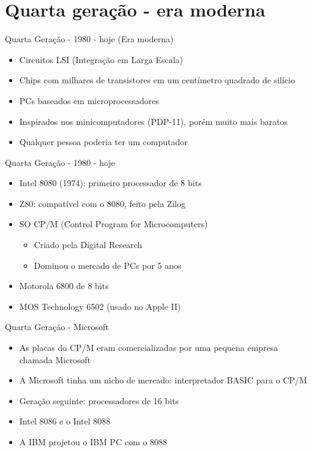 \documentclass{beamer}
\begin{document}
\section{Quarta geração - era moderna}
\begin{frame}{Quarta Geração - 1980 - hoje (Era moderna)}
      \begin{itemize}
          \item Circuitos LSI (Integração em Larga Escala)
          \item Chips com milhares de transistores em um centímetro quadrado de silício
          \item PCs baseados em microprocessadores
          \item Inspirados nos minicomputadores (PDP-11), porém muito mais baratos
          \item Qualquer pessoa poderia ter um computador
      \end{itemize}
  \end{frame}
  \begin{frame}{Quarta Geração - 1980 - hoje}
      \begin{itemize}
          \item Intel 8080 (1974): primeiro processador de 8 bits
          \item Z80: compatível com o 8080, feito pela Zilog
          \item SO CP/M (Control Program for Microcomputers)
              \begin{itemize}
                  \item Criado pela Digital Research
                  \item Dominou o mercado de PCs por 5 anos
              \end{itemize}
          \item Motorola 6800 de 8 bits
          \item MOS Technology 6502 (usado no Apple II)
      \end{itemize}
  \end{frame}
  \begin{frame}{Quarta Geração - Microsoft}
      \begin{itemize}
          \item As placas do CP/M eram comercializadas por uma pequena empresa chamada Microsoft
          \item A Microsoft tinha um nicho de mercado: interpretador BASIC para o CP/M
          \item Geração seguinte: processadores de 16 bits
          \item Intel 8086 e o Intel 8088
          \item A IBM projetou o IBM PC com o 8088
      \end{itemize}
  \end{frame}
\end{document}
